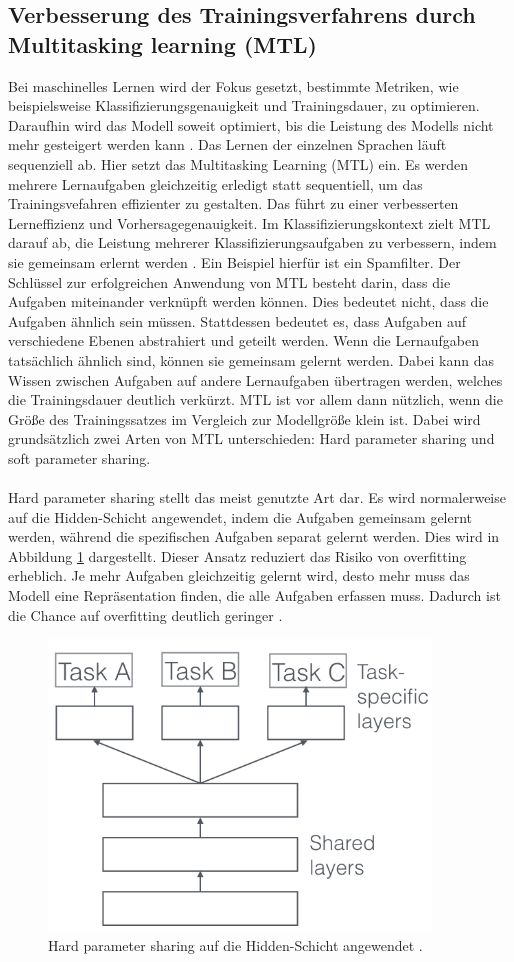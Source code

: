\subsection{Verbesserung des Trainingsverfahrens durch Multitasking learning (MTL)}
 Bei maschinelles Lernen wird der Fokus gesetzt, bestimmte Metriken, wie beispielsweise Klassifizierungsgenauigkeit und Trainingsdauer, zu optimieren. Daraufhin wird das Modell soweit optimiert, bis die Leistung des Modells nicht mehr gesteigert werden kann \cite{Ruder.2017}. Das Lernen der einzelnen Sprachen läuft sequenziell ab. Hier setzt das Multitasking Learning (MTL) ein. Es werden mehrere Lernaufgaben gleichzeitig erledigt statt sequentiell, um das Trainingsvefahren effizienter zu gestalten. Das führt zu einer verbesserten Lerneffizienz und Vorhersagegenauigkeit. Im Klassifizierungskontext zielt MTL darauf ab, die Leistung mehrerer Klassifizierungsaufgaben zu verbessern, indem sie gemeinsam erlernt werden \cite{Lu_multitasklearning}. Ein Beispiel hierfür ist ein Spamfilter. Der Schlüssel zur erfolgreichen Anwendung von MTL besteht darin, dass die Aufgaben miteinander verknüpft werden können. Dies bedeutet nicht, dass die Aufgaben ähnlich sein müssen. Stattdessen bedeutet es, dass Aufgaben auf verschiedene Ebenen abstrahiert und geteilt werden. Wenn die Lernaufgaben tatsächlich ähnlich sind, können sie gemeinsam gelernt werden. Dabei kann das Wissen zwischen Aufgaben auf andere Lernaufgaben übertragen werden, welches die Trainingsdauer deutlich verkürzt. MTL ist vor allem dann nützlich, wenn die Größe des Trainingssatzes im Vergleich zur Modellgröße klein ist. Dabei wird grundsätzlich zwei Arten von MTL unterschieden: Hard parameter sharing und soft parameter sharing. \\ \\ Hard parameter sharing stellt das meist genutzte Art dar\cite{Ruder.2017}. Es wird normalerweise auf die Hidden-Schicht angewendet, indem die Aufgaben gemeinsam gelernt werden, während die spezifischen Aufgaben separat gelernt werden. Dies wird in Abbildung \ref{fig:hard} dargestellt. Dieser Ansatz reduziert das Risiko von overfitting erheblich. Je mehr Aufgaben gleichzeitig gelernt wird, desto mehr muss das Modell eine Repräsentation finden, die alle Aufgaben erfassen muss. Dadurch ist die Chance auf overfitting deutlich geringer \cite{Ruder.2017} \cite{Lu_multitasklearning}.
  \begin{figure}[h!]
 	\centering
 	\includegraphics[width=0.8\linewidth]{images/hard}
 	\caption{Hard parameter sharing auf die Hidden-Schicht angewendet \cite{Kulbear.2017}.} %
 	\label{fig:hard}
 \end{figure}

